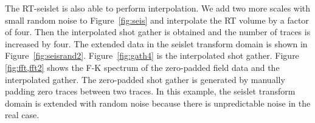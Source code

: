     The RT-seislet is also able to perform interpolation. 
    We add two more scales with small random noise to Figure~\ref{fig:seis} and 
    interpolate the RT volume by a factor of four. 
    Then the interpolated shot gather is obtained and the number of traces is 
    increased by four. 
    The extended data in the seislet transform domain is shown in 
    Figure~\ref{fig:seisrand2}. 
    Figure~\ref{fig:gath4} is the interpolated shot gather. 
    Figure \ref{fig:fft,fft2} shows the F-K spectrum of the zero-padded 
    field data and the interpolated gather. 
    The zero-padded shot gather is generated by manually padding zero traces 
    between two traces.
    In this example, the seislet transform domain is extended with random noise 
    because there is unpredictable noise in the real case.



